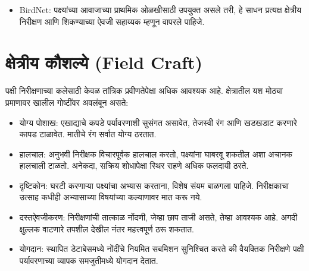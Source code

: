 \documentclass[a4paper,12pt,landscape]{memoir}
\begin{document}
{\begin{itemize}
  \item {\latintext BirdNet}: पक्ष्यांच्या आवाजाच्या प्राथमिक ओळखीसाठी उपयुक्त असले तरी, हे साधन प्रत्यक्ष क्षेत्रीय निरीक्षण आणि शिकण्याच्या ऐवजी सहाय्यक म्हणून वापरले पाहिजे.
  \end{itemize}
}{%
  \section*{\textbf{क्षेत्रीय कौशल्ये (Field Craft)}}
  पक्षी निरीक्षणाच्या कलेसाठी केवळ तांत्रिक प्रवीणतेपेक्षा अधिक आवश्यक आहे. क्षेत्रातील यश मोठ्या प्रमाणावर खालील गोष्टींवर अवलंबून असते:
  \begin{itemize}
  \item योग्य पोशाख: एखाद्याचे कपडे पर्यावरणाशी सुसंगत असावेत, तेजस्वी रंग आणि खडखडाट करणारे कापड टाळावेत. मातीचे रंग सर्वात योग्य ठरतात.
  
  \item हालचाल: अनुभवी निरीक्षक विचारपूर्वक हालचाल करतो, पक्ष्यांना घाबरवू शकतील अशा अचानक हालचाली टाळतो. अनेकदा, सक्रिय शोधापेक्षा स्थिर राहणे अधिक फलदायी ठरते.
  
  \item दृष्टिकोन: घरटी करणाऱ्या पक्ष्यांचा अभ्यास करताना, विशेष संयम बाळगला पाहिजे. निरीक्षकाचा उत्साह कधीही अभ्यासाच्या विषयांच्या कल्याणावर मात करू नये.
  
  \item दस्तऐवजीकरण: निरीक्षणांची तात्काळ नोंदणी, जेव्हा छाप ताजी असते, तेव्हा आवश्यक आहे. अगदी क्षुल्लक वाटणारे तपशील देखील नंतर महत्त्वपूर्ण ठरू शकतात.
  
  \item योगदान: स्थापित डेटाबेसमध्ये नोंदींचे नियमित सबमिशन सुनिश्चित करते की वैयक्तिक निरीक्षणे पक्षी पर्यावरणाच्या व्यापक समजुतीमध्ये योगदान देतात.
  \end{itemize}
}
\end{document}
